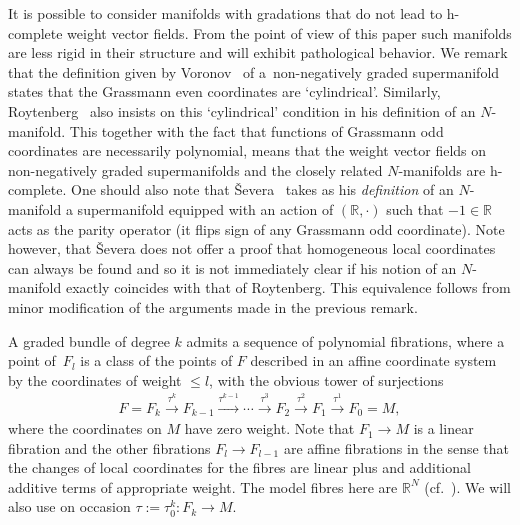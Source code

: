 \documentclass[10pt,a4paper]{amsart}
\numberwithin{equation}{section}
\begin{document}
\begin{Remark}
It is possible to consider manifolds with gradations that do not lead to h-complete weight vector f\/ields. From the point of view of this paper such manifolds are less rigid in their structure and will exhibit pathological behavior.  We remark that the def\/inition given by Voronov~\cite{Voronov:2001qf} of a~non-negatively graded supermanifold states that the Grassmann even coordinates are `cylindrical'.  Similarly, Roytenberg~\cite{Roytenberg:2001} also insists on this `cylindrical' condition in his def\/inition of an $N$-manifold.   This together with the fact that functions of Grassmann odd coordinates are necessarily polynomial, means that the weight vector f\/ields on  non-negatively graded supermanifolds and the closely related $N$-manifolds are h-complete. One should also note that \v{S}evera~\cite{Severa:2005} takes as his \emph{definition} of an $N$-manifold a supermanifold equipped with an action of $(\mathbb{R}, \cdot)$ such that $-1  \in \mathbb{R}$ acts as the parity operator (it f\/lips sign of any Grassmann odd coordinate). Note however, that \v{S}evera does not of\/fer a proof that homogeneous local coordinates can always be found and so it is not immediately clear if his notion of an $N$-manifold exactly coincides with that of  Roytenberg. This equivalence follows from minor modif\/ication of the arguments made in the previous remark.
\end{Remark}

A graded bundle  of degree $k$  admits a sequence of  polynomial f\/ibrations, where a point of~$F_{l}$ is a class of the points of $F$ described  in an af\/f\/ine coordinate system by the coordinates of weight $\leq l$, with the obvious tower of  surjections
\begin{gather*}%
F=F_{k} \stackrel{\tau^{k}}{\longrightarrow} F_{k-1} \stackrel{\tau^{k-1}}{\longrightarrow}   \cdots \stackrel{\tau^{3}}{\longrightarrow} F_{2} \stackrel{\tau^{2}}{\longrightarrow}F_{1} \stackrel{\tau^{1}}{\longrightarrow} F_{0} = M,
\end{gather*}
 where the coordinates on $M$ have zero weight. Note that  $F_{1} \rightarrow M$ is a linear f\/ibration and the other f\/ibrations $F_{l} \rightarrow F_{l-1}$ are af\/f\/ine f\/ibrations in the sense that the changes of local coordinates for the f\/ibres are linear plus and additional additive terms of appropriate weight.  The model f\/ibres here are $\mathbb{R}^{N}$ (cf.~\cite{Grabowski2012}).  We will also use on occasion $\tau := \tau^{k}_{0}\colon F_{k} \rightarrow M$.
\end{document}
